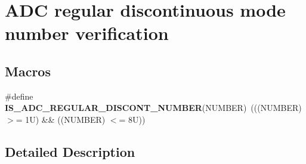 \hypertarget{group___a_d_c__regular__discontinuous__mode__number__verification}{}\section{A\+DC regular discontinuous mode number verification}
\label{group___a_d_c__regular__discontinuous__mode__number__verification}
\subsection*{Macros}
\begin{DoxyCompactItemize}
\item 
\mbox{\label{group___a_d_c__regular__discontinuous__mode__number__verification_ga5883ebe5aa1b4424a532439dbb2e9428}} 
\#define {\bfseries I\+S\+\_\+\+A\+D\+C\+\_\+\+R\+E\+G\+U\+L\+A\+R\+\_\+\+D\+I\+S\+C\+O\+N\+T\+\_\+\+N\+U\+M\+B\+ER}(N\+U\+M\+B\+ER)~(((N\+U\+M\+B\+ER) $>$= 1\+U) \&\& ((\+N\+U\+M\+B\+E\+R) $<$= 8\+U))
\end{DoxyCompactItemize}


\subsection{Detailed Description}
